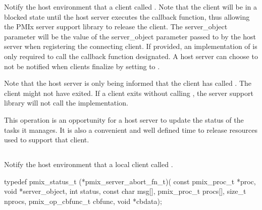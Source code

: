 \descr

Notify the host environment that a client called .
Note that the client will be in a blocked state until the host server executes the callback function, thus allowing the PMIx server support library to release the client.
The server_object parameter will be the value of the server_object parameter passed to
 by the host server when registering the connecting client.  If provided, an implementation of 
is only required to
call the callback function designated.  A host server can choose to not be notified when clients finalize by setting  to .

Note that the host server is only being informed that the client has called .  The client might not have exited.  If a client
exits without calling , the server support library will not call the  implementation.

\advicermstart
This operation is an opportunity for a host server
to update the status of the tasks it manages.  It is also a convenient and well defined time to release resources used to support that client.
\advicermend


\subsection{}

\summary

Notify the host environment that a local client called .

\format

\cspecificstart
\begin{codepar}
typedef pmix_status_t (*pmix_server_abort_fn_t)(
                             const pmix_proc_t *proc,
                             void *server_object,
                             int status,
                             const char msg[],
                             pmix_proc_t procs[],
                             size_t nprocs,
                             pmix_op_cbfunc_t cbfunc,
                             void *cbdata);
\end{codepar}
\cspecificend


\begin{arglist}
\end{arglist}

